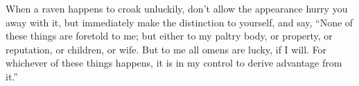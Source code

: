 When a raven  happens to croak unluckily, don't allow  the appearance hurry you
away with it, but immediately make the distinction to yourself, and say, ``None
of these things are foretold to me;  but either to my paltry body, or property,
or reputation, or children, or wife. But to  me all omens are lucky, if I will.
For whichever of these things happens, it  is in my control to derive advantage
from it.''
